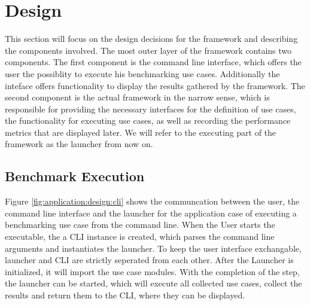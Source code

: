 \section{Design}

\label{sec:application:design}

This section will focus on the design decisions for the framework and describing
the components involved. The most outer layer of the framework contains two
components. The first component is the command line interface, which offers the
user the possiblity to execute his benchmarking use cases. Additionally the
inteface offers functionality to display the results gathered by the framework.
The second component is the actual framework in the narrow sense, which is
responsible for providing the necessary interfaces for the definition of use
cases, the functionality for executing use cases, as well as recording the
performance metrics that are displayed later. We will refer to the executing
part of the framework as the launcher from now on.

\subsection{Benchmark Execution}

Figure \ref{fig:application:design:cli} shows the communcation
between the user, the command line interface and the launcher for the
application case of executing a benchmarking use case from the command line.
When the User starts the executable, the a CLI instance is created, which parses
the command line arguments and instantiates the launcher. To keep the user
interface exchangable, launcher and CLI are strictly seperated from each other.
After the Launcher is initialized, it will import the use case modules. With the
completion of the step, the launcher can be started, which will execute all
collected use cases, collect the results and return them to the CLI, where they
can be displayed.

